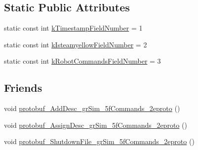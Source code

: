 \subsection*{Static Public Attributes}
\begin{DoxyCompactItemize}
\item 
static const int \hyperlink{classgr_sim___commands_a0cea2c202f8b5eee1cf70ee7944b555b}{k\-Timestamp\-Field\-Number} = 1
\item 
static const int \hyperlink{classgr_sim___commands_a12c4b2be87fa8002259d6dfb4ba4a3f0}{k\-Isteamyellow\-Field\-Number} = 2
\item 
static const int \hyperlink{classgr_sim___commands_a1c3ae12990f5a222520efae4a78b688a}{k\-Robot\-Commands\-Field\-Number} = 3
\end{DoxyCompactItemize}
\subsection*{Friends}
\begin{DoxyCompactItemize}
\item 
void \hyperlink{classgr_sim___commands_ac56e60ad0bb74c2cc15c499e4e6e996c}{protobuf\-\_\-\-Add\-Desc\-\_\-gr\-Sim\-\_\-5f\-Commands\-\_\-2eproto} ()
\item 
void \hyperlink{classgr_sim___commands_aa24258071f5401caefec1ae7a152e533}{protobuf\-\_\-\-Assign\-Desc\-\_\-gr\-Sim\-\_\-5f\-Commands\-\_\-2eproto} ()
\item 
void \hyperlink{classgr_sim___commands_a8aa7b603907edafe6e4ec382b96eb854}{protobuf\-\_\-\-Shutdown\-File\-\_\-gr\-Sim\-\_\-5f\-Commands\-\_\-2eproto} ()
\end{DoxyCompactItemize}


